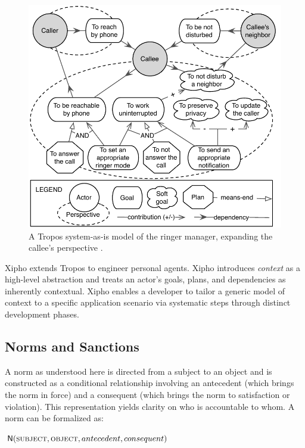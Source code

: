 \begin{figure}[!htb] \centering
\includegraphics[angle=0,width={0.60\columnwidth}]{Chapter-3/fig/ringer-manager-tropos-actor-model.pdf}
\caption[A Tropos model of the ringer manager]{A Tropos system-as-is model of the ringer manager, expanding the callee's perspective \protect\citep{Murukannaiah-AAMAS14-Xipho}.}
\label{fig:xipho-ringer-as-is} \end{figure}

Xipho \citep{Murukannaiah-AAMAS14-Xipho} extends Tropos to engineer
personal agents. Xipho introduces \emph{context} as a high-level
abstraction and treats an actor's goals, plans, and dependencies as
inherently contextual. Xipho enables a developer to tailor a generic
model of context to a specific application scenario via systematic steps
through distinct development phases.

\subsection{Norms and Sanctions}

A norm as understood here \citep{Singh-2013-Norms} is directed from a
subject to an object and is constructed as a conditional relationship
involving an antecedent (which brings the norm in force) and a
consequent (which brings the norm to satisfaction or violation). This
representation yields clarity on who is accountable to whom. A norm can
be formalized as:
%
\begin{center}
$\mathsf{N}(\textsc{subject},\textsc{object}, antecedent, consequent)$
\end{center}

